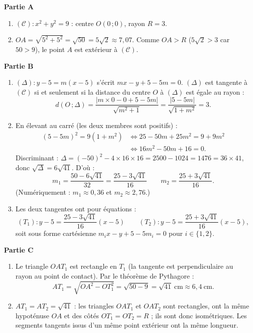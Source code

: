 \documentclass[11pt]{article}
\begin{document}
\begin{corrige}
\textbf{Partie A}
\begin{enumerate}
\item $(\mathscr{C}):x^2+y^2=9$ : centre $O(0\,;0)$, rayon $R=3$.
\item $OA=\sqrt{5^2+5^2}=\sqrt{50}=5\sqrt{2}\approx 7{,}07$. Comme $OA>R$ ($5\sqrt{2}>3$ car $50>9$), le point $A$ est extérieur à $(\mathscr{C})$.
\end{enumerate}

\textbf{Partie B}
\begin{enumerate}
\item $(\Delta):y-5=m(x-5)$ s'écrit $mx-y+5-5m=0$. $(\Delta)$ est tangente à $(\mathscr{C})$ si et seulement si la distance du centre $O$ à $(\Delta)$ est égale au rayon :
\[ d(O\,;\Delta)=\dfrac{|m\times 0-0+5-5m|}{\sqrt{m^2+1}}=\dfrac{|5-5m|}{\sqrt{1+m^2}}=3. \]
\item En élevant au carré (les deux membres sont positifs) :
\begin{align*}
(5-5m)^2=9(1+m^2) &\iff 25-50m+25m^2=9+9m^2\\
&\iff 16m^2-50m+16=0.
\end{align*}
Discriminant : $\Delta=(-50)^2-4\times 16\times 16=2500-1024=1476=36\times 41$, donc $\sqrt{\Delta}=6\sqrt{41}$. D'où :
\[ m_1=\dfrac{50-6\sqrt{41}}{32}=\dfrac{25-3\sqrt{41}}{16} \qquad m_2=\dfrac{25+3\sqrt{41}}{16}. \]
(Numériquement : $m_1\approx 0{,}36$ et $m_2\approx 2{,}76$.)
\item Les deux tangentes ont pour équations :
\[ (T_1):y-5=\dfrac{25-3\sqrt{41}}{16}(x-5) \qquad (T_2):y-5=\dfrac{25+3\sqrt{41}}{16}(x-5), \]
soit sous forme cartésienne $m_i x-y+5-5m_i=0$ pour $i\in\{1,2\}$.
\end{enumerate}

\textbf{Partie C}
\begin{enumerate}
\item Le triangle $OAT_1$ est rectangle en $T_1$ (la tangente est perpendiculaire au rayon au point de contact). Par le théorème de Pythagore :
\[ AT_1=\sqrt{OA^2-OT_1^2}=\sqrt{50-9}=\sqrt{41}\ \text{cm}\approx 6{,}4\ \text{cm}. \]
\item $AT_1=AT_2=\sqrt{41}$ : les triangles $OAT_1$ et $OAT_2$ sont rectangles, ont la même hypoténuse $OA$ et des côtés $OT_1=OT_2=R$ ; ils sont donc isométriques. Les segments tangents issus d'un même point extérieur ont la même longueur.
\end{enumerate}


\end{corrige}
\end{document}
